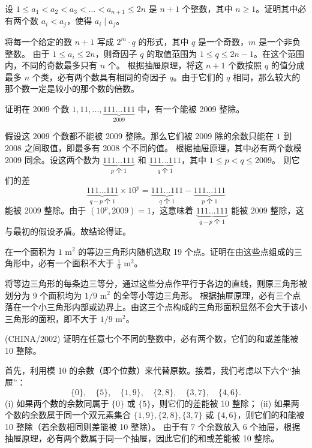 \begin{questions}
\question 设 $1 \le a_1 < a_2 < a_3 < \dots < a_{n+1} \le 2n$ 是 $n + 1$ 个整数，其中 $n \ge 1$。证明其中必有两个数 $a_i < a_j$，使得 $a_i \mid a_j$。
\begin{solution}
将每一个给定的数 $n + 1$ 写成 $2^m \cdot q$ 的形式，其中 $q$ 是一个奇数，$m$ 是一个非负整数。
由于 $1 \le a_i \le 2n$，则奇因子 $q$ 的取值范围为 $1 \le q \le 2n - 1$。在这个范围内，不同的奇数最多只有 $n$ 个。
根据抽屉原理，将这 $n + 1$ 个数按照 $q$ 的值分成最多 $n$ 个类，必有两个数具有相同的奇因子 $q$。由于它们的 $q$ 相同，那么较大的那个数一定是较小的那个数的倍数。
\end{solution}

\question 证明在 2009 个数 $1, 11, \dots, \underbrace{111 \dots 111}_{2009}$ 中，有一个能被 2009 整除。
\begin{solution}
假设这 2009 个数都不能被 2009 整除。那么它们被 2009 除的余数只能在 $1$ 到 $2008$ 之间取值，即最多有 2008 个不同的值。
根据抽屉原理，其中必有两个数模 2009 同余。设这两个数为 $\underbrace{111 \dots 111}_{p \text{ 个 } 1}$ 和 $\underbrace{111 \dots 111}_{q \text{ 个 } 1}$，其中 $1 \le p < q \le 2009$。
则它们的差
\[
\underbrace{111 \dots 111}_{q-p \text{ 个 } 1} \times 10^p = \underbrace{111 \dots 111}_{q \text{ 个 } 1} - \underbrace{111 \dots 111}_{p \text{ 个 } 1}
\]
能被 2009 整除。由于 $(10^p, 2009) = 1$，这意味着 $\underbrace{111 \dots 111}_{q-p \text{ 个 } 1}$ 能被 2009 整除，这与最初的假设矛盾。故结论得证。
\end{solution}

\question 在一个面积为 $1 \text{ m}^2$ 的等边三角形内随机选取 19 个点。证明在由这些点组成的三角形中，必有一个面积不大于 $\frac{1}{9} \text{ m}^2$。
\begin{solution}
将等边三角形的每条边三等分，通过这些分点作平行于各边的直线，则原三角形被划分为 9 个面积均为 $1/9 \text{ m}^2$ 的全等小等边三角形。
根据抽屉原理，必有三个点落在一个小三角形内部或边界上。由这三个点构成的三角形面积显然不会大于该小三角形的面积，即不大于 $1/9 \text{ m}^2$。
\end{solution}

\question (CHINA/2002) 证明在任意七个不同的整数中，必有两个数，它们的和或差能被 10 整除。
\begin{solution}
首先，利用模 10 的余数（即个位数）来代替原数。接着，我们考虑以下六个“抽屉”：
\[
\{0\}, \quad \{5\}, \quad \{1, 9\}, \quad \{2, 8\}, \quad \{3, 7\}, \quad \{4, 6\}.
\]
(i) 如果两个数的余数同属于 $\{0\}$ 或 $\{5\}$，则它们的差能被 10 整除；
(ii) 如果两个数的余数属于同一个双元素集合 $\{1, 9\}, \{2, 8\}, \{3, 7\}$ 或 $\{4, 6\}$，则它们的和能被 10 整除（若余数相同则差能被 10 整除）。
由于有 7 个余数放入 6 个抽屉，根据抽屉原理，必有两个数属于同一个抽屉，因此它们的和或差能被 10 整除。
\end{solution}


\end{questions}
